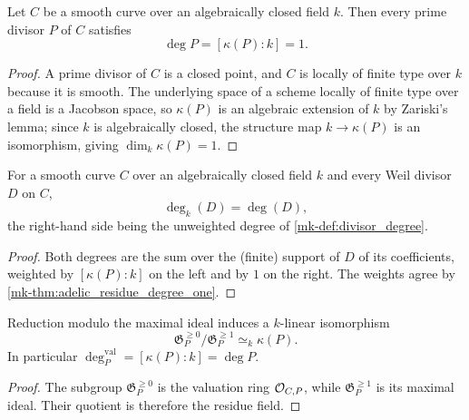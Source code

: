 \begin{theorem}
  \label{mk-thm:adelic_residue_degree_one}
  \leanok
  Let \(C\) be a smooth curve over an algebraically closed field \(k\). Then
  every prime divisor \(P\) of \(C\) satisfies
  \[
    \deg P = [\kappa(P):k] = 1 .
  \]
\end{theorem}
\begin{proof}
  \leanok
  A prime divisor of \(C\) is a closed point, and \(C\) is locally of finite
  type over \(k\) because it is smooth. The underlying space of a scheme
  locally of finite type over a field is a Jacobson space, so
  \(\kappa(P)\) is an algebraic extension of \(k\) by Zariski's lemma; since
  \(k\) is algebraically closed, the structure map \(k \to \kappa(P)\) is an
  isomorphism, giving \(\dim_k \kappa(P) = 1\).
\end{proof}

\begin{corollary}
  \label{mk-cor:adelic_degK_eq_degree}
  \leanok
  For a smooth curve \(C\) over an algebraically closed field \(k\) and every
  Weil divisor \(D\) on \(C\),
  \[
    \deg_k(D) = \deg(D),
  \]
  the right-hand side being the unweighted degree of \ref{mk-def:divisor_degree}.
\end{corollary}
\begin{proof}
  \leanok
  Both degrees are the sum over the (finite) support of \(D\) of its
  coefficients, weighted by \([\kappa(P):k]\) on the left and by \(1\) on the
  right. The weights agree by \ref{mk-thm:adelic_residue_degree_one}.
\end{proof}

\begin{lemma}
  \label{mk-lem:adelic_valuation_quotient_residue_field}
  Reduction modulo the maximal ideal induces a \(k\)-linear isomorphism
  \[
    \mathfrak G_P^{\ge0}/\mathfrak G_P^{\ge1}\simeq_k\kappa(P).
  \]
  In particular \(\deg_P^{\mathrm{val}}=[\kappa(P):k]=\deg P\).
\end{lemma}
\begin{proof}
  The subgroup \(\mathfrak G_P^{\ge0}\) is the valuation ring
  \(\mathcal{O}_{C,P}\), while \(\mathfrak G_P^{\ge1}\) is its maximal ideal.
  Their quotient is therefore the residue field.
\end{proof}

